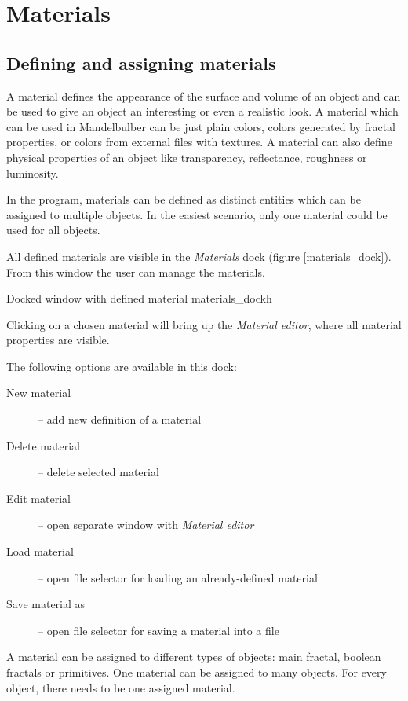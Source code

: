 \section{Materials}\label{materials}

\subsection{Defining and assigning materials}\label{defining-materials}

A material defines the appearance of the surface and volume of an object and can be used to give an object an interesting or even a realistic look. A material which can be used in Mandelbulber can be just plain colors, colors generated by fractal properties, or colors from external files with textures. A material can also define physical properties of an object like transparency, reflectance, roughness or luminosity.

In the program, materials can be defined as distinct entities which can be assigned to multiple objects. In the easiest scenario, only one material could be used for all objects.

All defined materials are visible in the \emph{Materials} dock (figure \ref{materials_dock}).
From this window the user can manage the materials.

{Docked window with defined material}
{materials_dock}{h}

Clicking on a chosen material will bring up the \emph{Material editor}, where all material properties are visible.

The following options are available in this dock:

\begin{description}
		\item[New material] -- add new definition of a material
		\item[Delete material] -- delete selected material
		\item[Edit material] -- open separate window with \emph{Material editor}
		\item[Load material] -- open file selector for loading an already-defined material
		\item[Save material as] -- open file selector for saving a material into a file
\end{description}

A material can be assigned to different types of objects: main fractal, boolean fractals or primitives. One material can be assigned to many objects. For every object, there needs to be one assigned material.
\pagebreak
